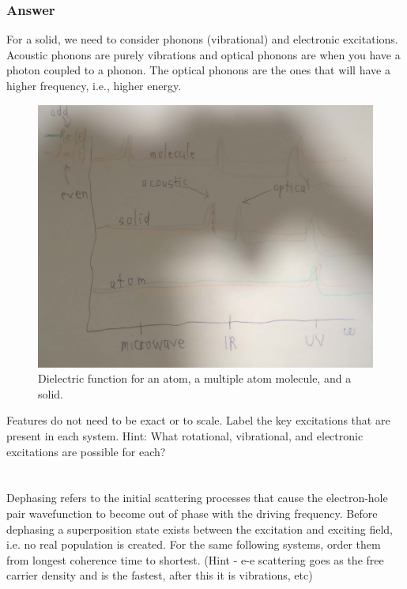 \documentclass[12pt]{article}
\begin{document}
\subsubsection{Answer}
For a solid, we need to consider phonons (vibrational) and electronic excitations.
Acoustic phonons are purely vibrations and optical phonons are when you have a photon coupled to a phonon. The optical phonons are the ones that will have a higher frequency, i.e., higher energy.\\
\begin{figure}[h]
\centering
\includegraphics[width=\textwidth]{dielectrics_v2.jpg}
\caption{Dielectric function for an atom, a multiple atom molecule, and a solid.}
\end{figure}
Features do not need to be exact or to scale. Label the key excitations that are present in each system. Hint: What rotational, vibrational, and electronic excitations are possible for each?

\section{}
Dephasing refers to the initial scattering processes that cause the electron-hole pair wavefunction to become out of phase with the driving frequency. Before dephasing a superposition state exists between the excitation and exciting field, i.e. no real population is created. For the same following systems, order them from longest coherence time to shortest. (Hint - e-e scattering goes as the free carrier density and is the fastest, after this it is vibrations, etc)
\end{document}
